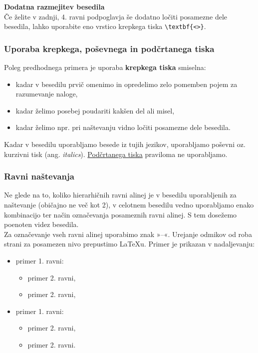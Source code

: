 \textbf{Dodatna razmejitev besedila}\\
Če želite v zadnji, 4. ravni podpoglavja še dodatno ločiti posamezne dele besedila, lahko uporabite eno vrstico krepkega tiska \verb|\textbf{<>}|.

\subsubsection{Uporaba krepkega, poševnega in podčrtanega tiska}\label{sec:emphasis_types}

Poleg predhodnega primera je uporaba \textbf{krepkega tiska} smiselna:
\begin{itemize}
\item kadar v besedilu prvič omenimo in opredelimo zelo pomemben pojem za razumevanje naloge,
\item kadar želimo posebej poudariti kakšen del ali misel,
\item kadar želimo npr. pri naštevanju vidno ločiti posamezne dele besedila.
\end{itemize}

Kadar v besedilu uporabljamo besede iz tujih jezikov, uporabljamo poševni oz. kurzivni tisk (ang. \emph{italics}). \underline{Podčrtanega tiska} praviloma ne uporabljamo.


\subsubsection{Ravni naštevanja}\label{sec:itemizing}

Ne glede na to, koliko hierarhičnih ravni alinej je v besedilu uporabljenih za naštevanje (običajno ne več kot 2), v celotnem besedilu vedno uporabljamo enako kombinacijo ter način označevanja posameznih ravni alinej. S tem dosežemo poenoten videz besedila.\\

Za označevanje vseh ravni alinej uporabimo znak »--«. Urejanje odmikov od roba strani za posamezen nivo prepustimo \LaTeX u. Primer je prikazan v nadaljevanju:
\begin{itemize}
\item primer 1. ravni:
\begin{itemize}
\item primer 2. ravni,
\item primer 2. ravni,
\end{itemize}
\item primer 1. ravni:
\begin{itemize}
\item primer 2. ravni,
\item primer 2. ravni.
\end{itemize}
\end{itemize}

